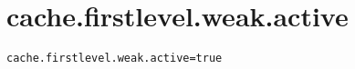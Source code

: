 \section{cache.firstlevel.weak.active}
\label{configuration:CacheFirstlevelWeakActive}
\AvailableInJavaAndCsharp{\TODO}
\begin{lstlisting}[style=Props,caption={Usage example for \textit{cache.firstlevel.weak.active}}]
cache.firstlevel.weak.active=true
\end{lstlisting}